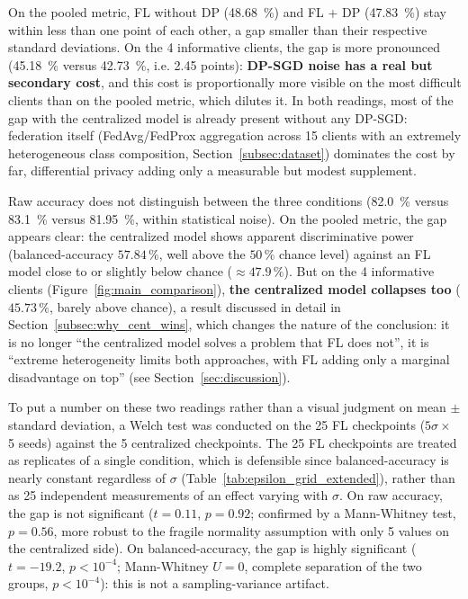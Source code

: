 \documentclass{article}
\begin{document}
On the pooled metric, FL without DP (48.68~\%) and FL + DP (47.83~\%) stay within
less than one point of each other, a gap smaller than their respective standard
deviations. On the 4 informative clients, the gap is more pronounced (45.18~\%
versus 42.73~\%, i.e. 2.45 points): \textbf{DP-SGD noise has a real but secondary
cost}, and this cost is proportionally more visible on the most difficult clients
than on the pooled metric, which dilutes it. In both readings, most of the gap
with the centralized model is already present without any DP-SGD: federation
itself (FedAvg/FedProx aggregation across 15 clients with an extremely
heterogeneous class composition, Section~\ref{subsec:dataset}) dominates the cost
by far, differential privacy adding only a measurable but modest supplement.

Raw accuracy does not distinguish between the three conditions (82.0~\% versus
83.1~\% versus 81.95~\%, within statistical noise). On the pooled metric, the gap
appears clear: the centralized model shows apparent discriminative power
(balanced-accuracy $57.84\,\%$, well above the $50\,\%$ chance level) against an FL
model close to or slightly below chance ($\approx 47.9\,\%$). But on the 4
informative clients (Figure~\ref{fig:main_comparison}), \textbf{the centralized
model collapses too} ($45.73\,\%$, barely above chance), a result discussed in
detail in Section~\ref{subsec:why_cent_wins}, which changes the nature of the
conclusion: it is no longer ``the centralized model solves a problem that FL does
not'', it is ``extreme heterogeneity limits both approaches, with FL adding only a
marginal disadvantage on top'' (see Section~\ref{sec:discussion}).

To put a number on these two readings rather than a visual judgment on mean $\pm$
standard deviation, a Welch test was conducted on the 25 FL checkpoints ($5 \sigma
\times$ 5 seeds) against the 5 centralized checkpoints. The 25 FL checkpoints are
treated as replicates of a single condition, which is defensible since
balanced-accuracy is nearly constant regardless of $\sigma$
(Table~\ref{tab:epsilon_grid_extended}), rather than as 25 independent
measurements of an effect varying with $\sigma$. On raw accuracy, the gap is not
significant ($t=0.11$, $p=0.92$; confirmed by a Mann-Whitney test, $p=0.56$, more
robust to the fragile normality assumption with only 5 values on the centralized
side). On balanced-accuracy, the gap is highly significant ($t=-19.2$, $p < 10^{-4}$;
Mann-Whitney $U=0$, complete separation of the two groups, $p < 10^{-4}$): this is
not a sampling-variance artifact.
\end{document}
